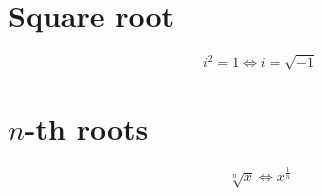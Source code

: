 \documentclass{article}
\begin{document}
\section*{Square root}

\[i^2 = 1 \Leftrightarrow i = \sqrt{-1}\]

\section*{$n$-th roots}

\[\sqrt[n]{x} \Leftrightarrow x^{\frac{1}{n}}\]
\end{document}
